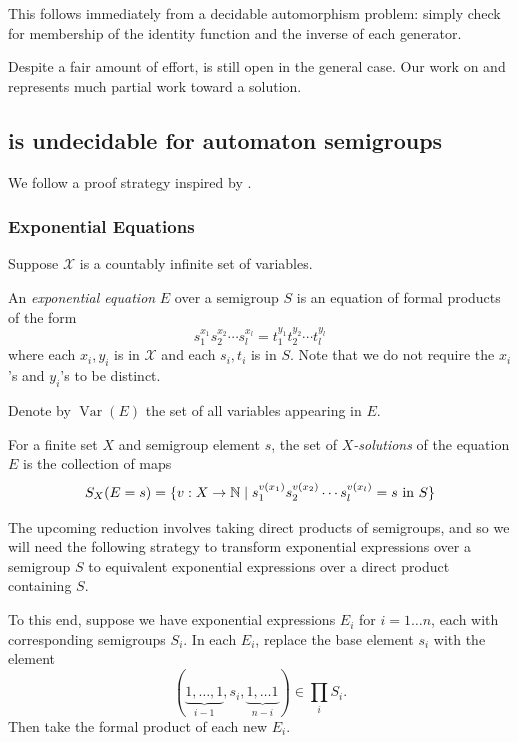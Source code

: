 \documentclass[11pt, titlepage]{article}
\begin{document}
This follows immediately from a decidable automorphism
 problem: simply check for membership of the
identity function and the inverse of each generator.

Despite a fair amount of effort,  is still open in
the general case. Our work on  and
 represents much partial work toward a solution.

\subsection{ is undecidable for automaton semigroups}
We follow a proof strategy inspired by \cite{Konig15:knapsack}.


\subsubsection{Exponential Equations}

Suppose $\mathcal{X}$ is a countably infinite set of variables.
\begin{definition}
  An \emph{exponential equation} $E$ over a semigroup $S$ is an equation of 
  formal products of the form
  \[
    s_1^{x_1} s_2^{x_2}\cdots s_l^{x_l}
    = t_1^{y_1} t_2^{y_2}\cdots t_l^{y_l}
  \]
  where each $x_i, y_i$ is in $\mathcal{X}$ and each $s_i, t_i$ is in $S$. Note
  that we do not require the $x_i$'s and $y_i$'s to be distinct.
\end{definition}

Denote by $\operatorname{Var}(E)$ the set of all variables appearing
in $E$.
\begin{definition}
  For a finite set $X$ and semigroup element $s$, the set of
  \emph{$X$-solutions} of the equation $E$ is the collection of maps
  \[
    S_X(E = s) = \{ v : X \rightarrow \mathbb{N} \mid
    s_1^{v(x_1)} s_2^{v(x_2)}\cdots s_l^{v(x_l)} = s
    \text{ \normalfont in } S
    \}
  \]
\end{definition}

The upcoming reduction involves taking direct products of semigroups,
and so we will need the following strategy to transform exponential
expressions over a semigroup $S$ to equivalent exponential expressions
over a direct product containing $S$.

To this end, suppose we have exponential expressions $E_i$ for
$i = 1\ldots n$, each with corresponding semigroups $S_i$. In each
$E_i$, replace the base element $s_i$ with the element
\[
  (\underbrace{1, \ldots, 1}_\text{$i-1$}, s_i,
   \underbrace{1, \ldots 1}_\text{$n-i$}) \in \prod_i S_i.
\]
Then take the formal product of each new $E_i$.
\end{document}
